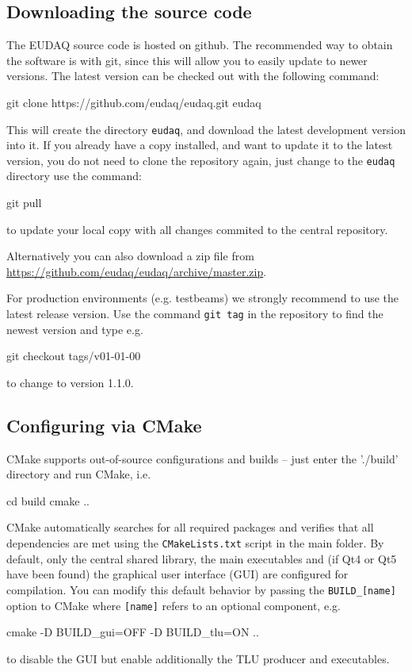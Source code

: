 \subsection{Downloading the source code}
The EUDAQ source code is hosted on github. The recommended way to obtain the software is with git,
since this will allow you to easily update to newer versions.
The latest version can be checked out with the following command:
\begin{listing}[mybash]
git clone https://github.com/eudaq/eudaq.git eudaq
\end{listing}

This will create the directory \texttt{eudaq}, and download the latest
development version into it. 
If you already have a copy installed, and want to update it to the
latest version, you do not need to clone the repository again, just change to the \texttt{eudaq} directory use the command:
\begin{listing}[mybash]
git pull
\end{listing}
to update your local copy with all changes commited to the central repository.

Alternatively you can also download a zip file from
\url{https://github.com/eudaq/eudaq/archive/master.zip}.

For production environments (e.g. testbeams) we strongly recommend to
use the latest release version. Use the command \texttt{git tag} in
the repository to find the newest version and type e.g. 
\begin{listing}[mybash]
git checkout tags/v01-01-00
\end{listing}
to change to version 1.1.0.

\subsection{Configuring via CMake}
CMake supports out-of-source configurations and builds -- just enter
the './build' directory and run CMake, i.e.
\begin{listing}[mybash]
cd build
cmake ..
\end{listing}

CMake automatically searches for all required packages and verifies
that all dependencies are met using the \texttt{CMakeLists.txt} script in the
main folder. By default, only the central shared library, the main
executables and (if Qt4 or Qt5 have been found) the graphical user
interface (GUI) are configured for compilation. You can modify this
default behavior by passing the \texttt{BUILD\_[name]} option to
CMake where \texttt{[name]} refers to an optional component, e.g.
\begin{listing}[mybash]
cmake -D BUILD_gui=OFF -D BUILD_tlu=ON ..
\end{listing}
to disable the GUI but enable additionally the TLU producer and
executables.

